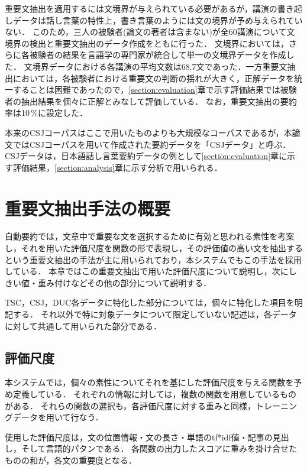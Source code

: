 重要文抽出を適用するには文境界が与えられている必要があるが，講演の書き起しデータは話し言葉の特性上，書き言葉のようには文の境界が予め与えられていない．
このため，三人の被験者(論文の著者は含まない)が全60講演について文境界の検出と重要文抽出のデータ作成をともに行った．
文境界においては，さらに各被験者の結果を言語学の専門家が統合して単一の文境界データを作成した．
文境界データにおける各講演の平均文数は68.7文であった．一方重要文抽出においては，各被験者における重要文の判断の揺れが大きく，正解データを統一することは困難であったので，\ref{section:evaluation}章で示す評価結果では被験者の抽出結果を個々に正解とみなして評価している．
なお，重要文抽出の要約率は10\,\%に設定した．

本来のCSJコーパスはここで用いたものよりも大規模なコーパスであるが，本論文ではCSJコーパスを用いて作成された要約データを「CSJデータ」と呼ぶ．
CSJデータは，日本語話し言葉要約データの例として\ref{section:evaluation}章に示す評価結果，\ref{section:analysis}章に示す分析で用いられる．

\section{重要文抽出手法の概要}
\label{section:system}

自動要約では，文章中で重要な文を選択するために有効と思われる素性を考案し，それを用いた評価尺度を関数の形で表現し，その評価値の高い文を抽出するという重要文抽出の手法が主に用いられており，本システムでもこの手法を採用している．
本章ではこの重要文抽出で用いた評価尺度について説明し，次にしきい値・重み付けなどその他の部分について説明する．

TSC，CSJ，DUC各データに特化した部分については，個々に特化した項目を明記する．
それ以外で特に対象データについて限定していない記述は，各データに対して共通して用いられた部分である．

\subsection{評価尺度}

本システムでは，個々の素性についてそれを基にした評価尺度を与える関数を予め定義している．
それぞれの情報に対しては，複数の関数を用意しているものがある．
それらの関数の選択も，各評価尺度に対する重みと同様，トレーニングデータを用いて行なう．

使用した評価尺度は，文の位置情報・文の長さ・単語のtf*idf値・記事の見出し，そして言語的パタンである．
各関数の出力したスコアに重みを掛け合せたものの和が，各文の重要度となる．

